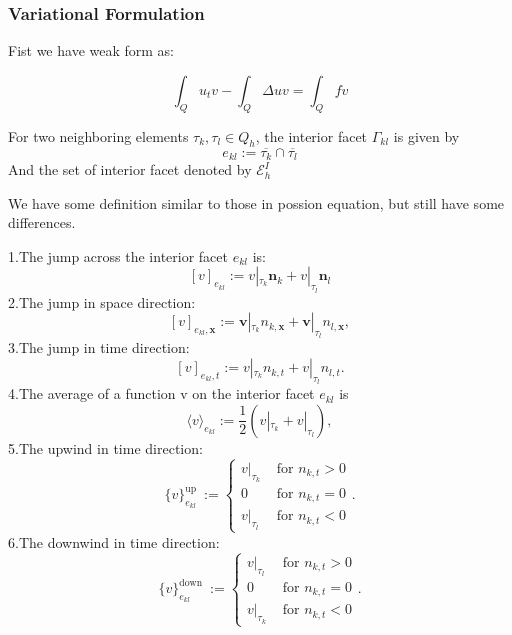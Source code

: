 \subsubsection*{Variational Formulation}

Fist we have weak form as:

\begin{equation}
    \int_Qu_tv-\int_Q\Delta uv = \int_Q fv
\end{equation}

\begin{definition}
    For two neighboring elements $\tau_k,\tau_l\in Q_h$, the interior facet $\Gamma_{kl}$ is given by
    $$e_{kl}:=\overline{\tau_k}\cap\overline{\tau_l}$$
    And the set of interior facet denoted by $\mathscr{E}_h^I$
\end{definition}

\begin{center}
\end{center}

We have some definition similar to those in possion equation, but still have some differences. 

\begin{definition}\label{def}
    1.The jump across the interior facet $e_{kl}$ is:
    $$[v]_{e_{k l}}:=v|_{\tau_{k}} \boldsymbol{n}_{k}+v|_{\tau_{l}} \boldsymbol{n}_{l} $$
    2.The jump in space direction:
    $$[v]_{e_{k l}, \boldsymbol{x}}:=\boldsymbol{v}|_{\tau_{k}} n_{k, \boldsymbol{x}}+\boldsymbol{v}|_{\tau_{l}} n_{l, \boldsymbol{x}} ,$$
    3.The jump in time direction:
    $$[v]_{e_{k l}, t}:=v|_{\tau_{k}} n_{k, t}+v|_{\tau_{l}} n_{l, t}  .$$
    4.The average of a function  v  on the interior facet  $e_{kl}$  is
    $$\langle v\rangle_{e_{kl}}:=\frac{1}{2}\left(v|_{\tau_{k}}+v|_{\tau_{l}}\right) ,$$
    5.The upwind in time direction:
    $$\{v\}_{e_{k l}}^{\text {up }}:=\left\{\begin{array}{ll}
        v|_{ \tau_{k}} & \text { for } n_{k, t}>0 \\
        0 & \text { for } n_{k, t}=0 \\
        v|_{ \tau_{l}} & \text { for } n_{k, t}<0
        \end{array}  .\right.$$
    6.The downwind in time direction:
    $$\{v\}_{e_{k l}}^{\text {down }}:=\left\{\begin{array}{ll}
        v|_{ \tau_{l}} & \text { for } n_{k, t}>0 \\
        0 & \text { for } n_{k, t}=0 \\
        v|_{ \tau_{k}} & \text { for } n_{k, t}<0
        \end{array}  .\right.$$
\end{definition}


